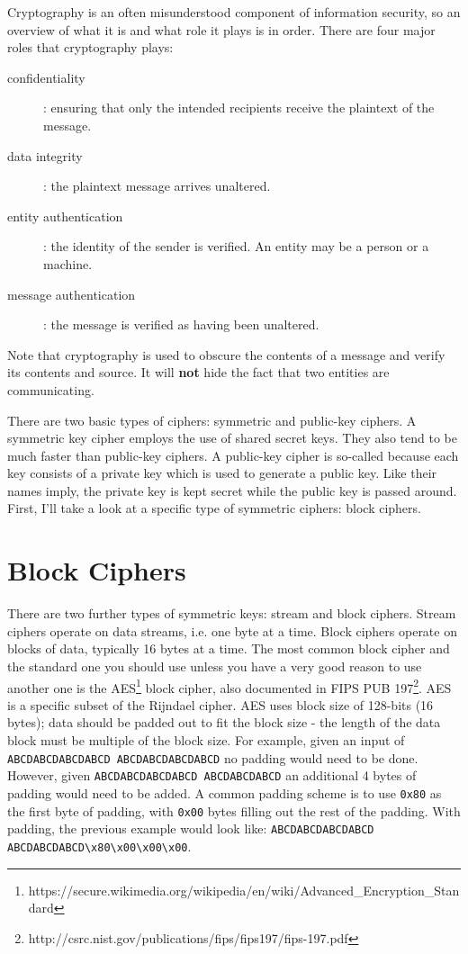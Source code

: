 \documentclass[letterpaper,10pt]{article}
\begin{document}
Cryptography is an often misunderstood component of information security, so
an overview of what it is and what role it plays is in order. There are four
major roles that cryptography plays:
\begin{description}
  \item[confidentiality]: ensuring that only the intended recipients receive the
plaintext of the message.    
  \item[data integrity]: the plaintext message arrives unaltered.     
  \item[entity authentication]: the identity of the sender is verified. An entity
may be a person or a machine.   
  \item[message authentication]: the message is verified as having been 
unaltered.     
\end{description}

Note that cryptography is used to obscure the contents of a message and verify
its contents and source. It will \textbf{not} hide the fact that two entities are 
communicating.

There are two basic types of ciphers: symmetric and public-key ciphers. A 
symmetric key cipher employs the use of shared secret keys. They also tend to
be much faster than public-key ciphers. A public-key cipher is so-called because
each key consists of a private key which is used to generate a public key. Like
their names imply, the private key is kept secret while the public key is 
passed around. First, I'll take a look at a specific type of symmetric ciphers:
block ciphers.

\section{Block Ciphers}
There are two further types of symmetric keys: stream and block ciphers. Stream
ciphers operate on data streams, i.e. one byte at a time. Block ciphers operate
on blocks of data, typically 16 bytes at a time. The most common block cipher
and the standard one you should use unless you have a very good reason to use
another one is the AES\footnote{https://secure.wikimedia.org/wikipedia/en/wiki/Advanced\_Encryption\_Standard}
block cipher, also documented in FIPS PUB 197\footnote{http://csrc.nist.gov/publications/fips/fips197/fips-197.pdf}.
AES is a specific subset of the Rijndael cipher. AES uses block size of 
128-bits (16 bytes); data should be padded out to fit the block size - the
length of the data block must be multiple of the block size. For example, 
given an input of \texttt{ABCDABCDABCDABCD ABCDABCDABCDABCD} no padding would
need to be done. However, given \texttt{ABCDABCDABCDABCD ABCDABCDABCD} an 
additional 4 bytes of padding would need to be added. A common padding scheme 
is to use \texttt{0x80} as the first byte of padding, with \texttt{0x00} bytes 
filling out the rest of the padding. With padding, the previous example would 
look like: \verb|ABCDABCDABCDABCD ABCDABCDABCD\x80\x00\x00\x00|.
\end{document}
